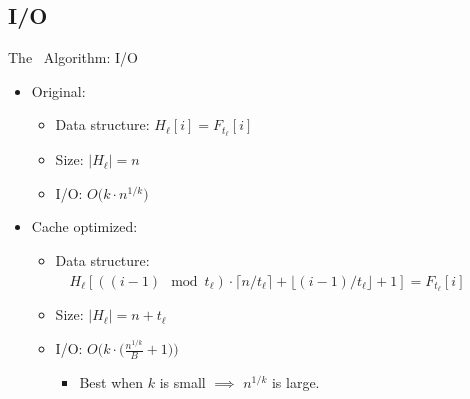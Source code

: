\documentclass{beamer}
\begin{document}
\subsection{I/O}
\begin{frame}{The \fprintk\ Algorithm: I/O}
    \begin{itemize}
        \item Original:
        \begin{itemize}
            \item Data structure: $H_\ell[i] = F_{t_\ell}[i]$
            \item Size: $|H_\ell| = n$
            \item I/O: $O\big(k\cdot n^{1/k}\big)$
        \end{itemize}
        \item Cache optimized:
        \begin{itemize}
            \item Data structure: \\~~$H_\ell[((i-1)\mod t_\ell)\cdot\lceil n/t_\ell\rceil+\lfloor (i-1)/t_\ell\rfloor+1] = F_{t_\ell}[i]$
            \item Size: $|H_\ell| = n+t_\ell$
            \item I/O: $O\Big(k\cdot\Big(\frac{n^{1/k}}{B}+1\Big)\Big)$
            \begin{itemize}
                \item Best when $k$ is small $\implies$ $n^{1/k}$ is large.
            \end{itemize}
        \end{itemize}
     \end{itemize}
\end{frame}
\end{document}
